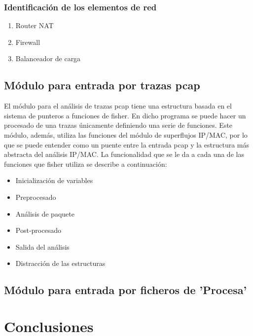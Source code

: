 \documentclass[twoside, 12pt]{epstfg}
\begin{document}
\subsection{Identificación de los elementos de red}
\begin{enumerate}[itemsep=0pt, topsep = 0pt]
\item Router NAT
\item Firewall
\item Balanceador de carga
\end{enumerate}

\section{Módulo para entrada por trazas pcap}
El módulo para el análisis de trazas pcap tiene una estructura basada en el sistema de punteros a funciones de fisher. En dicho programa se puede hacer un procesado de una trazas únicamente definiendo una serie de funciones. Este módulo, además, utiliza las funciones del módulo de superflujos IP/MAC, por lo que se puede entender como un puente entre la entrada pcap y la estructura más abstracta del análisis IP/MAC. La funcionalidad que se le da a cada una de las funciones que fisher utiliza se describe a continuación:
\begin{itemize}
	\item{Inicialización de variables}
	\item{Preprocesado}
	\item{Análisis de paquete}
	\item{Post-procesado}
	\item{Salida del análisis}
	\item{Distracción de las estructuras}
\end{itemize}

\section{Módulo para entrada por ficheros de 'Procesa'}

\chapter{Conclusiones}
\label{chap:Conclusiones}

\backmatter
\appendix

\cleardoublepage

\nocite{*}
{}

\cleardoublepage
\printindex
\end{document}
